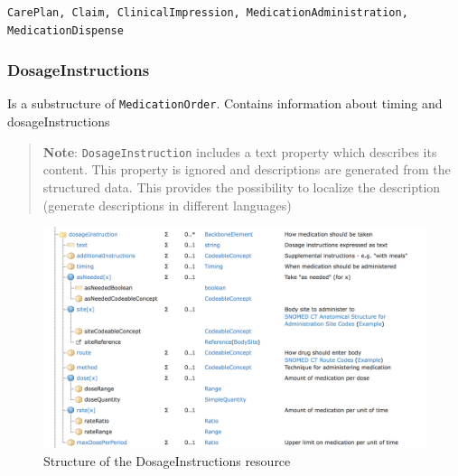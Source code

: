 \documentclass{article}
\begin{document}
\begin{verbatim}
CarePlan, Claim, ClinicalImpression, MedicationAdministration, MedicationDispense
\end{verbatim}

\subsubsection{DosageInstructions}\label{res:dosageinstructions}

Is a substructure of \texttt{MedicationOrder}. Contains information
about timing and dosageInstructions

\begin{quote}
\textbf{Note}: \texttt{DosageInstruction} includes a text property which
describes its content. This property is ignored and descriptions are
generated from the structured data. This provides the possibility to
localize the description (generate descriptions in different languages)
\end{quote}

\begin{figure}[H]
\centering
\includegraphics[width=\linewidth]{resources/FHIR/DosageInstructions/DosageInstruction-Structure.png}
\caption{Structure of the DosageInstructions resource}
\label{fig:structure-dosageinstructions}
\end{figure}
\end{document}
